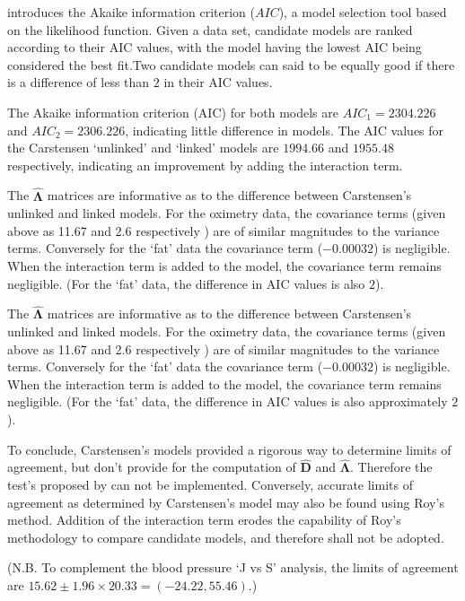 \documentclass[12pt, a4paper]{report}
\theoremstyle{plain}
\theoremstyle{definition}
\theoremstyle{remark}
\begin{document}
		
		\citet{akaike} introduces the Akaike information criterion ($AIC$), a model 
		selection tool based on the likelihood function. Given a data set, candidate models
		are ranked according to their AIC values, with the model having the lowest AIC being considered the best fit.Two candidate models can said to be equally good if there is a difference of less than $2$ in their AIC values.
		
		The Akaike information criterion (AIC) for both models are $AIC_{1} = 2304.226$ and $AIC_{2} = 2306.226$, indicating little difference in models. The AIC values for the Carstensen `unlinked' and `linked' models are $1994.66$ and $1955.48$ respectively, indicating an improvement by adding the interaction term.

	
	The $\boldsymbol{\hat{\Lambda}}$ matrices are informative as to the difference between Carstensen's unlinked and linked models. For the oximetry data, the covariance terms (given above as 11.67 and 2.6 respectively ) are of similar magnitudes to the variance terms. Conversely for the `fat' data the covariance term ($-0.00032$) is negligible. When the interaction term is added to the model, the covariance term remains negligible. (For the `fat' data, the difference in AIC values is also $2$).
	
	
	The $\boldsymbol{\hat{\Lambda}}$ matrices are informative as to the difference between Carstensen's unlinked and linked models. For the oximetry data, the covariance terms (given above as 11.67 and 2.6 respectively ) are of similar magnitudes to the variance terms. Conversely for the `fat' data the covariance term ($-0.00032$) is negligible. When the interaction term is added to the model, the covariance term remains negligible. (For the `fat' data, the difference in AIC values is also approximately $2$).
	
	To conclude, Carstensen's models provided a rigorous way to determine limits of agreement, but don't provide for the computation of $\boldsymbol{\hat{D}}$ and $\boldsymbol{\hat{\Lambda}}$. Therefore the test's proposed by \citet{roy} can not be implemented. Conversely, accurate limits of agreement as determined by Carstensen's model may also be found using Roy's method. Addition of the interaction term erodes the capability of Roy's methodology to compare candidate models, and therefore shall not be adopted.

	
	(N.B. To complement the blood pressure `J vs S' analysis, the limits of agreement are $15.62 \pm 1.96 \times 20.33 = (-24.22, 55.46)$.)
	\newpage
	
\end{document}
